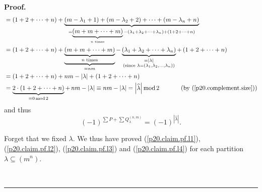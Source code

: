 \documentclass[numbers=enddot,12pt,final,onecolumn,notitlepage]{scrartcl}%
\theoremstyle{definition}
\newenvironment{proof}[1][Proof]{\noindent\textbf{#1.} }{\ \rule{0.5em}{0.5em}}
\let\sumnonlimits\sum
\renewcommand{\sum}{\sumnonlimits\limits}
\begin{document}
\begin{enumerate}
\begin{proof}
\begin{align*}
&  =\left(  1+2+\cdots+n\right)  +\underbrace{\left(  m-\lambda_{1}+1\right)
+\left(  m-\lambda_{2}+2\right)  +\cdots+\left(  m-\lambda_{n}+n\right)
}_{=\underbrace{\left(  m+m+\cdots+m\right)  }_{n\text{ times}}-\left(
\lambda_{1}+\lambda_{2}+\cdots+\lambda_{n}\right)  +\left(  1+2+\cdots
+n\right)  }\\
&  =\left(  1+2+\cdots+n\right)  +\underbrace{\underbrace{\left(
m+m+\cdots+m\right)  }_{n\text{ times}}}_{=nm}-\underbrace{\left(  \lambda
_{1}+\lambda_{2}+\cdots+\lambda_{n}\right)  }_{\substack{=\left\vert
\lambda\right\vert \\\text{(since }\lambda=\left(  \lambda_{1},\lambda
_{2},\ldots,\lambda_{n}\right)  \text{)}}}+\left(  1+2+\cdots+n\right) \\
&  =\left(  1+2+\cdots+n\right)  +nm-\left\vert \lambda\right\vert +\left(
1+2+\cdots+n\right) \\
&  =\underbrace{2\cdot\left(  1+2+\cdots+n\right)  }_{\equiv
0\operatorname{mod}2}+\,nm-\left\vert \lambda\right\vert \equiv nm-\left\vert
\lambda\right\vert =\left\vert \widehat{\lambda}\right\vert \operatorname{mod}%
2\ \ \ \ \ \ \ \ \ \ \left(  \text{by (\ref{p20.complement.size})}\right)
\end{align*}
and thus
\begin{equation}
\left(  -1\right)  ^{\sum P+\sum Q_{\lambda}^{\left(  n,m\right)  }}=\left(
-1\right)  ^{\left\vert \widehat{\lambda}\right\vert }.
\label{p20.claim.pf.l4}%
\end{equation}


Forget that we fixed $\lambda$. We thus have proved (\ref{p20.claim.pf.l1}),
(\ref{p20.claim.pf.l2}), (\ref{p20.claim.pf.l3}) and (\ref{p20.claim.pf.l4})
for each partition $\lambda\subseteq\left(  m^{n}\right)  $.


\end{proof}
\end{enumerate}
\end{document}
